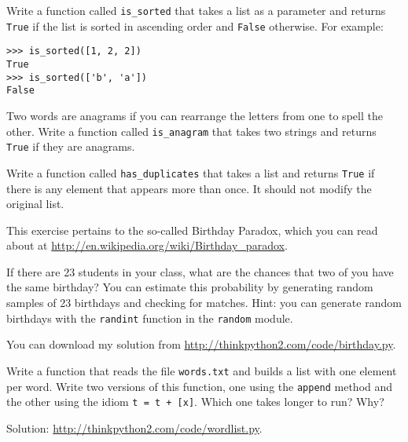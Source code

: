 \documentclass[10pt]{book}
\begin{document}
\begin{exercise}
Write a function called \verb"is_sorted" that takes a list as a
parameter and returns {\tt True} if the list is sorted in ascending
order and {\tt False} otherwise.  For example:

\begin{verbatim}
>>> is_sorted([1, 2, 2])
True
>>> is_sorted(['b', 'a'])
False
\end{verbatim}

\end{exercise}


\begin{exercise}
\label{anagram}

Two words are anagrams if you can rearrange the letters from one
to spell the other.  Write a function called \verb"is_anagram"
that takes two strings and returns {\tt True} if they are anagrams.
\end{exercise}



\begin{exercise}
\label{duplicate}

Write a function called \verb"has_duplicates" that takes
a list and returns {\tt True} if there is any element that
appears more than once.  It should not modify the original
list.

\end{exercise}


\begin{exercise}

This exercise pertains to the so-called Birthday Paradox, which you
can read about at \url{http://en.wikipedia.org/wiki/Birthday_paradox}.

If there are 23 students in your class, what are the chances
that two of you have the same birthday?  You can estimate this
probability by generating random samples of 23 birthdays
and checking for matches.  Hint: you can generate random birthdays
with the {\tt randint} function in the {\tt random} module.

You can download my
solution from \url{http://thinkpython2.com/code/birthday.py}.

\end{exercise}



\begin{exercise}

Write a function that reads the file {\tt words.txt} and builds
a list with one element per word.  Write two versions of
this function, one using the {\tt append} method and the
other using the idiom {\tt t = t + [x]}.  Which one takes
longer to run?  Why?

Solution: \url{http://thinkpython2.com/code/wordlist.py}.

\end{exercise}
\end{document}
